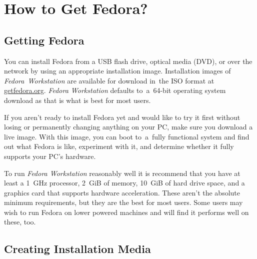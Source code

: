 \chapter*{How to Get Fedora?}
\section*{Getting Fedora}

You can install Fedora from a USB flash drive, optical media (DVD), or over the network by using an appropriate installation image. Installation images of \emph{Fedora~Workstation} are available for download in~the ISO format at \url{getfedora.org}. \emph{Fedora Workstation} defaults to~a~64-bit operating system download as that is what is best for most users.

If you aren't ready to install Fedora yet and would like to try it first without losing or permanently changing anything on your PC, make sure you download a live image. With this image, you can boot to~a~fully functional system and find out what Fedora is like, experiment with it, and determine whether it fully supports your PC's hardware.

To run \emph{Fedora Workstation} reasonably well it is recommend that you have at least a 1~GHz processor, 2~GiB of memory, 10~GiB of hard drive space, and a graphics card that supports hardware acceleration. These aren't the absolute minimum requirements, but they are the best for most users. Some users may wish to run Fedora on lower powered machines and will find it performs well on these, too.

\section*{Creating Installation Media}

